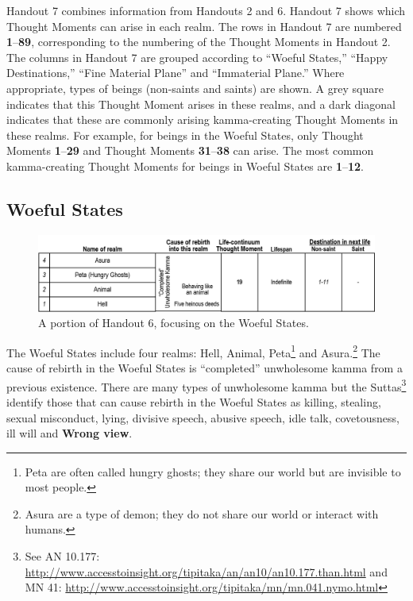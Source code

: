 Handout 7 combines information from Handouts 2 and 6. Handout 7 shows which Thought Moments can arise in each realm. The rows in Handout 7 are numbered \textbf{1}--\textbf{89}, corresponding to the numbering of the Thought Moments in Handout 2. The columns in Handout 7 are grouped according to “Woeful States,” “Happy Destinations,” “Fine Material Plane” and “Immaterial Plane.” Where appropriate, types of beings (non-saints and saints) are shown. A grey square indicates that this Thought Moment arises in these realms, and a dark diagonal indicates that these are commonly arising kamma-creating Thought Moments in these realms. For example, for beings in the Woeful States, only Thought Moments \textbf{1}--\textbf{29} and Thought Moments \textbf{31}--\textbf{38} can arise. The most common kamma-creating Thought Moments for beings in Woeful States are \textbf{1}--\textbf{12}.

\pagebreak

\subsection*{Woeful States}

\begin{figure}[h]
\centering
\includegraphics[width=0.9\linewidth]{./Diagrams/Woeful1}
\caption{A portion of Handout 6, focusing on the Woeful States.}
\label{fig:Woeful1}
\end{figure}

The Woeful States include four realms: Hell, Animal, Peta\footnote{Peta are often called hungry ghosts; they share our world but are invisible to most people.} and Asura.\footnote{Asura are a type of demon; they do not share our world or interact with humans.} The cause of rebirth in the Woeful States is “completed” unwholesome kamma from a previous existence. There are many types of unwholesome kamma but the Suttas\footnote{See AN 10.177: \url{http://www.accesstoinsight.org/tipitaka/an/an10/an10.177.than.html} and MN 41: \url{http://www.accesstoinsight.org/tipitaka/mn/mn.041.nymo.html}} identify those that can cause rebirth in the Woeful States as killing, stealing, sexual misconduct, lying, divisive speech, abusive speech, idle talk, covetousness, ill will and \textbf{Wrong view}.

